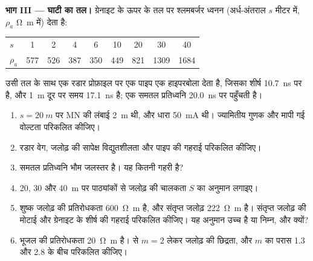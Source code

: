 \begin{problem}
\medskip\noindent\textbf{भाग III --- घाटी का तल।} ग्रेनाइट के ऊपर के तल पर
श्लमबर्जर ध्वनन (अर्ध-अंतराल $s$ मीटर में,
$\rho_a$ \unit{\ohm\metre} में) देता है:
\begin{center}
\small
\begin{tabular}{lcccccccc}
\hline
$s$ & 1 & 2 & 4 & 6 & 10 & 20 & 30 & 40 \\
$\rho_a$ & 577 & 526 & 387 & 350 & 449 & 821 & 1309 & 1684 \\
\hline
\end{tabular}
\end{center}
उसी तल के साथ एक रडार प्रोफ़ाइल पर एक पाइप एक हाइपरबोला देता है, जिसका
शीर्ष \qty{10.7}{ns} पर है, और \qty{1}{m} दूर पर समय \qty{17.1}{ns} है;
एक समतल प्रतिध्वनि \qty{20.0}{ns} पर पहुँचती है।
\begin{enumerate}[resume]
\item $s = \qty{20}{m}$ पर MN की लंबाई \qty{2}{m} थी, और धारा
  \qty{50}{mA} थी। ज्यामितीय गुणक और मापी गई वोल्टता परिकलित कीजिए।
\item रडार वेग, जलोढ़ की सापेक्ष विद्युतशीलता
  और पाइप की गहराई परिकलित कीजिए।
\item समतल प्रतिध्वनि भौम जलस्तर है। यह कितनी गहरी है?
\item 20, 30 और
  \qty{40}{m} पर पाठ्यांकों से जलोढ़ की चालकता $S$ का अनुमान लगाइए।
\item शुष्क जलोढ़ की प्रतिरोधकता \qty{600}{\ohm\metre} है, और संतृप्त
  जलोढ़ \qty{222}{\ohm\metre} है। संतृप्त जलोढ़ की मोटाई
  और ग्रेनाइट के शीर्ष की गहराई परिकलित कीजिए। यह अनुमान उच्च है या निम्न,
  और क्यों?
\item भूजल की प्रतिरोधकता \qty{20}{\ohm\metre} है।  से
  $m = 2$ लेकर जलोढ़ की छिद्रता, और $m$ का परास
  \num{1.3} और \num{2.8} के बीच परिकलित कीजिए।
\end{enumerate}


\end{problem}
